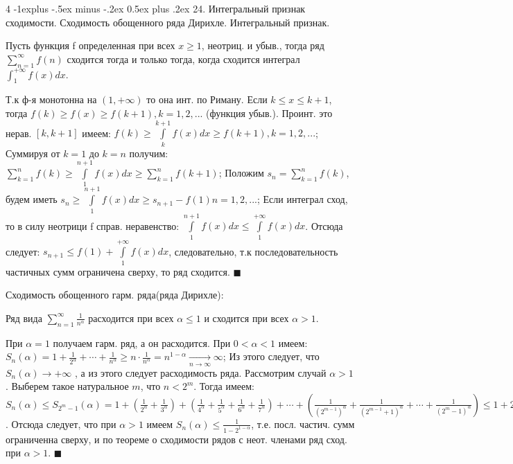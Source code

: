 \documentclass[unicode,10pt, landscape]{article}
\makeatletter
\renewcommand{\subsection}{\@startsection{subsection}{2}{0mm}%
                                {-1explus -.5ex minus -.2ex}%
                                {0.5ex plus .2ex}%
                                {\normalfont\normalsize\bfseries}}
\newenvironment{Proof} %
{\par\noindent{\bf Док-во:}} %
{\hfill$\scriptstyle\blacksquare$}
\makeatother
\begin{document}
\begin{multicols}{4}
 \subsection{24. Интегральный признак сходимости. Сходимость обощенного ряда Дирихле.}
 Интегральный признак.
 \begin{Th}
  Пусть функция f определенная при всех $x\geq1$, неотриц. и убыв., тогда ряд $\sum_{n=1}^{\infty}f(n)$ сходится тогда и только тогда, когда сходится интеграл $\int_{1}^{+\infty}{f(x)dx}$.
  \begin{Proof}
   Т.к ф-я монотонна на $(1, +\infty)$ то она инт. по Риману. Если $k\leq x\leq k+1$, тогда $f(k)\geq f(x)\geq f(k+1), k=1,2, ...$ (функция убыв.). Проинт. это нерав. $ \left[k,k+1\right]$ имеем: $f(k)\geq \int\limits_{k}^{k+1}{f(x)dx}\geq f(k+1), k=1,2, ...$; Суммируя от $k=1$ до $k=n$ получим: $\sum\limits_{k=1}^{n}{f(k)}\geq \int\limits_{1}^{n+1}{f(x)dx}\geq \sum\limits_{k=1}^{n}{f(k+1)}$; Положим $s_{n}=\sum_{k=1}^{n}{f(k)}$, будем иметь $s_{n}\geq \int\limits_{1}^{n+1}{f(x)dx}\geq s_{n+1}-f(1)
    n=1,2, ...$; Если интеграл сход, то в силу неотрици f справ. неравенство: $\int\limits_{1}^{n+1}{f(x)dx}\leq \int\limits_{1}^{+\infty}{f(x)dx}$. Отсюда следует: $s_{n+1}\leq f(1)+\int\limits_{1}^{+\infty}{f(x)dx}$, следовательно, т.к последовательность частичных сумм ограничена сверху, то ряд сходится.
  \end{Proof}
 \end{Th}
 Сходимость обощенного гарм. ряда(ряда Дирихле):
 \begin{Th}
  Ряд вида $\sum_{n = 1}^{\infty}\frac{1}{n^\alpha}$ расходится при всех $\alpha \leq 1$ и сходится при всех $\alpha > 1$.
  \begin{Proof}
   При $\alpha=1$ получаем гарм. ряд, а он расходится. При $0<\alpha<1$ имеем: $S_{n}(\alpha)=1+ \frac{1}{2^{\alpha}}+\cdots +\frac{1}{n^{\alpha}}\geq n \cdot \frac{1}{n^{\alpha}}=n^{1-\alpha}\underset{n\rightarrow \infty }{\rightarrow}\infty$; Из этого следует, что $S_{n}(\alpha)\rightarrow +\infty$ , а из этого следует расходимость ряда. Рассмотрим случай $\alpha>1$. Выберем такое натуральное $m$, что $n<2^{m}$. Тогда имеем: $S_{n}(\alpha)\leq S_{2^{m}-1}(\alpha)=1+\left ( \frac{1}{2^{\alpha}}+\frac{1}{3^{\alpha}} \right )+\left ( \frac{1}{4^{\alpha}}+\frac{1}{5^{\alpha}}+\frac{1}{6^{\alpha}}+\frac{1}{7^{\alpha}} \right )+ \cdots +\left ( \frac{1}{(2^{m-1})^{\alpha}}+\frac{1}{(2^{m-1}+1)^{\alpha}}+\cdots +\frac{1}{(2^{m}-1)^{\alpha}} \right )\leq 1+2^{1-\alpha}+(2^{2})^{1-\alpha}+\cdots +(2^{m-1})^{1-\alpha}=1+2^{1-\alpha}+(2^{1-\alpha})^{2}+\cdots +(2^{1-\alpha})^{m-1}=\frac{1-(2^{1-\alpha})^{m}}{1-2^{1-\alpha}}$. Отсюда следует, что при $\alpha>1$ имеем $S_{n}(\alpha)\leq \frac{1}{1-2^{1-\alpha}}$, т.е. посл. частич. сумм ограниченна сверху, и по теореме о сходимости рядов с неот. членами ряд сход. при $\alpha>1$.
  \end{Proof}
 \end{Th}

\end{multicols}
\end{document}

